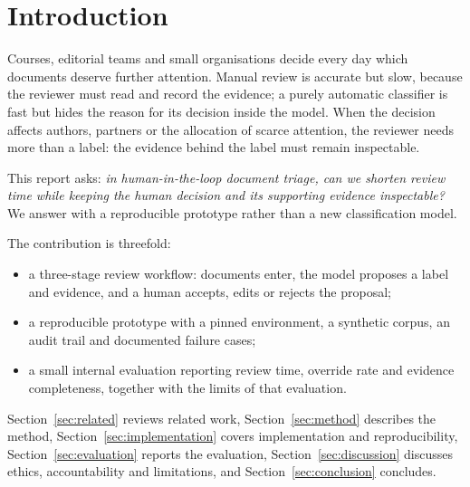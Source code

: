 \section{Introduction}
\label{sec:introduction}

Courses, editorial teams and small organisations decide every day which documents deserve
further attention. Manual review is accurate but slow, because the reviewer must read and
record the evidence; a purely automatic classifier is fast but hides the reason for its
decision inside the model. When the decision affects authors, partners or the allocation of
scarce attention, the reviewer needs more than a label: the evidence behind the label must
remain inspectable.

This report asks: \emph{in human-in-the-loop document triage, can we shorten review time
while keeping the human decision and its supporting evidence inspectable?} We answer with a
reproducible prototype rather than a new classification model.

The contribution is threefold:
\begin{itemize}
  \item a three-stage review workflow: documents enter, the model proposes a label and
        evidence, and a human accepts, edits or rejects the proposal;
  \item a reproducible prototype with a pinned environment, a synthetic corpus, an audit
        trail and documented failure cases;
  \item a small internal evaluation reporting review time, override rate and evidence
        completeness, together with the limits of that evaluation.
\end{itemize}

Section~\ref{sec:related} reviews related work, Section~\ref{sec:method} describes the
method, Section~\ref{sec:implementation} covers implementation and reproducibility,
Section~\ref{sec:evaluation} reports the evaluation, Section~\ref{sec:discussion} discusses
ethics, accountability and limitations, and Section~\ref{sec:conclusion} concludes.
